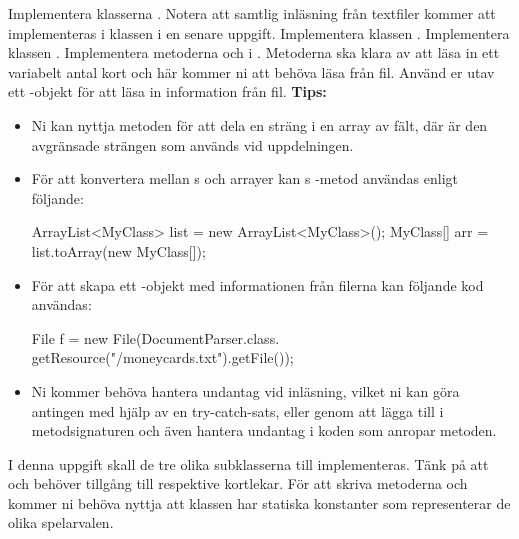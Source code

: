 \Subtask Implementera klasserna . Notera att samtlig inläsning från textfiler kommer att implementeras i klassen  i en senare uppgift.
\newline
\Subtask Implementera klassen .
\newline
\Subtask Implementera klassen .
\newline
\Subtask Implementera metoderna  och  i . Metoderna ska klara av att läsa in ett variabelt antal kort och här kommer ni att behöva läsa från fil. 
Använd er utav ett -objekt för att läsa in information från fil.
\newline
\newline
\textbf{Tips:}
\begin{itemize}
\item Ni kan nyttja metoden  för att dela en sträng i en array av fält, där  är den avgränsade strängen som används vid uppdelningen.

\item För att konvertera mellan s och arrayer kan s -metod användas enligt följande:

\begin{Code}
ArrayList<MyClass> list = new ArrayList<MyClass>();
MyClass[] arr = list.toArray(new MyClass[]{});
\end{Code}

\item För att skapa ett -objekt med informationen från filerna kan följande kod användas:

\begin{Code}
File f = new File(DocumentParser.class.
        getResource("/moneycards.txt").getFile());
\end{Code}

\item Ni kommer behöva hantera undantag  vid inläsning, vilket ni kan göra antingen med hjälp av en try-catch-sats, eller genom att lägga till  i metodsignaturen och även hantera undantag i koden som anropar metoden.

\end{itemize}
\Task I denna uppgift skall de tre olika subklasserna till  implementeras. Tänk på att  och  behöver tillgång till respektive kortlekar.
För att skriva metoderna  och  kommer ni behöva nyttja att klassen  har statiska konstanter som representerar de olika spelarvalen.


